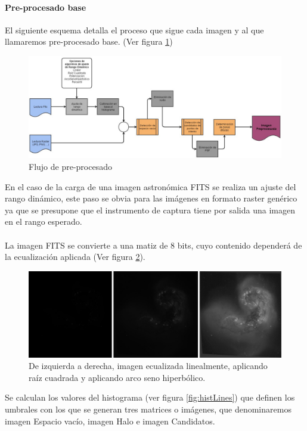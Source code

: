 	\paragraph{Pre-procesado base}
	El siguiente esquema detalla el proceso que sigue cada imagen y al que llamaremos pre-procesado base. (Ver figura \ref{fig:esquemaPreprocesado})\\
	\begin{figure}[!htb]
		\centering
		\includegraphics[width=1\textwidth]{images/tfg2016pipeline1.jpg}
		\caption{\label{fig:esquemaPreprocesado}Flujo de pre-procesado}
	\end{figure}
	En el caso de la carga de una imagen astronómica FITS se realiza un ajuste del rango dinámico, este paso se obvia para las imágenes en formato raster genérico ya que se presupone que el instrumento de captura tiene por salida una imagen en el rango esperado.\\ \\
	La imagen FITS se convierte a una matiz de 8 bits, cuyo contenido dependerá de la ecualización aplicada (Ver figura \ref{fig:distintasEqu}).\\
	\begin{figure}[!htb]
		\centering
		\includegraphics[width=1\textwidth]{images/ecu_lineal_sqr_asinh.jpg}
		\caption{\label{fig:distintasEqu}{\small De izquierda a derecha, imagen ecualizada linealmente, aplicando raíz cuadrada y aplicando arco seno hiperbólico.}}
	\end{figure}
	Se calculan los valores del histograma (ver figura \ref{fig:histLines}) que definen los umbrales con los que se generan tres matrices o imágenes, que denominaremos imagen {\scriptsize Espacio vacío}, imagen {\scriptsize Halo} e imagen {\scriptsize Candidatos}.\\ 
